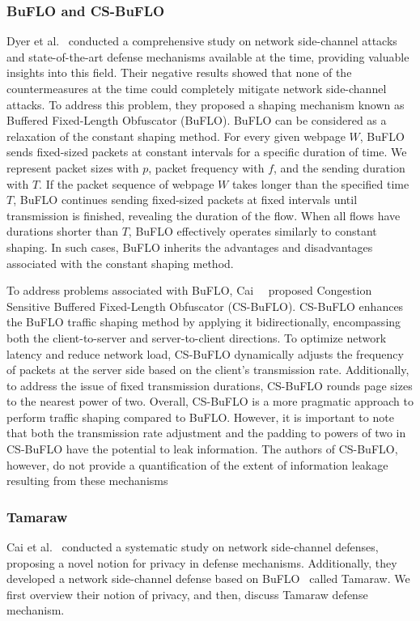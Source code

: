 \subsubsection{BuFLO and CS-BuFLO}\label{subsubsec:buflo}
Dyer et al.~\cite{dyer2012peek} conducted a comprehensive study on network side-channel attacks and state-of-the-art defense mechanisms available at the time, providing valuable insights into this field. 
Their negative results showed that none of the countermeasures at the time could completely mitigate network side-channel attacks.
To address this problem, they proposed a shaping mechanism known as Buffered Fixed-Length Obfuscator (BuFLO).
BuFLO can be considered as a relaxation of the constant shaping method.
For every given webpage $W$, BuFLO sends fixed-sized packets at constant intervals for a specific duration of time.
We represent packet sizes with $p$, packet frequency with $f$, and the sending duration with $T$. 
If the packet sequence of webpage $W$ takes longer than the specified time $T$, BuFLO continues sending fixed-sized packets at fixed intervals until transmission is finished, revealing the duration of the flow. 
When all flows have durations shorter than $T$, BuFLO effectively operates similarly to constant shaping.
In such cases, BuFLO inherits the advantages and disadvantages associated with the constant shaping method.~\cite{sirinam2018df}

To address problems associated with BuFLO, Cai~\etal~\cite{cai2014cs} proposed Congestion Sensitive Buffered Fixed-Length Obfuscator (CS-BuFLO).
CS-BuFLO enhances the BuFLO traffic shaping method by applying it bidirectionally, encompassing both the client-to-server and server-to-client directions. 
To optimize network latency and reduce network load, CS-BuFLO dynamically adjusts the frequency of packets at the server side based on the client's transmission rate.
Additionally, to address the issue of fixed transmission durations, CS-BuFLO rounds page sizes to the nearest power of two. 
Overall, CS-BuFLO is a more pragmatic approach to perform traffic shaping compared to BuFLO. 
However, it is important to note that both the transmission rate adjustment and the padding to powers of two in CS-BuFLO have the potential to leak information.
The authors of CS-BuFLO, however, do not provide a quantification of the extent of information leakage resulting from these mechanisms


\subsubsection{Tamaraw}\label{subsubsec:tamaraw}
Cai et al.~\cite{cai2014systematic} conducted a systematic study on network side-channel defenses, proposing a novel notion for privacy in defense mechanisms.
Additionally, they developed a network side-channel defense based on BuFLO~\cite{dyer2012peek} called Tamaraw. 
We first overview their notion of privacy, and then, discuss Tamaraw defense mechanism.



